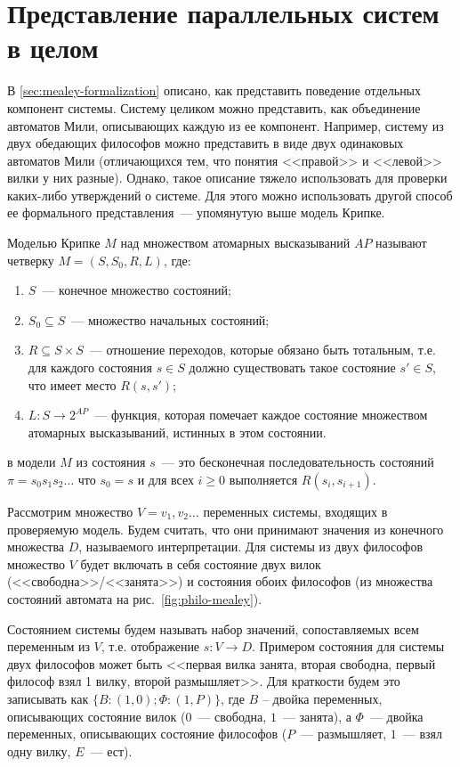 \section{Представление параллельных систем в целом}
\label{sec:kripke-formalization}

В \ref{sec:mealey-formalization} описано, как представить поведение отдельных
компонент системы. Систему целиком можно представить, как объединение автоматов Мили,
описывающих каждую из ее компонент. Например, систему из двух обедающих философов можно
представить в виде двух одинаковых автоматов Мили (отличающихся тем, что понятия
<<правой>> и <<левой>> вилки у них разные). Однако, такое описание тяжело использовать для
проверки каких-либо утверждений о системе. Для этого можно использовать другой способ ее
формального представления~--- упомянутую выше модель Крипке.

Моделью Крипке $M$ над множеством атомарных высказываний $AP$ называют четверку $M=(S,
S_0, R, L)$, где:
\begin{enumerate}
\item $S$~--- конечное множество состояний;
\item $S_0 \subseteq S$~--- множество начальных состояний;
\item $R \subseteq S \times S$~--- отношение переходов, которые обязано быть тотальным,
  т.е. для каждого состояния $s \in S$ должно существовать такое состояние $s' \in S$, что
  имеет место $R(s, s')$;
\item $L: S \rightarrow 2^{AP}$~--- функция, которая помечает каждое состояние множеством
  атомарных высказываний, истинных в этом состоянии.
\end{enumerate}

 в модели $M$ из состояния $s$~--- это бесконечная последовательность состояний
$\pi = s_0s_1s_2 \ldots$ что $s_0 = s$ и для всех $i \geq 0$ выполняется $R(s_i,
s_{i+1})$.

Рассмотрим множество $V = {v_1, v_2 \ldots}$ переменных системы, входящих в проверяемую
модель. Будем считать, что они принимают значения из конечного множества $D$, называемого
 интерпретации. Для системы из двух философов множество $V$ будет включать в
себя состояние двух вилок (<<свободна>>/<<занята>>) и состояния обоих философов (из
множества состояний автомата на рис.~\ref{fig:philo-mealey}). 

Состоянием системы будем называть набор значений, сопоставляемых всем переменным из $V$,
т.е. отображение $s: V \rightarrow D$. Примером состояния для системы двух философов может
быть <<первая вилка занята, вторая свободна, первый философ взял 1 вилку, второй
размышляет>>. Для краткости будем это записывать как $\{B: (1, 0); \Phi: (1, P)\}$, где $B$
-- двойка переменных, описывающих состояние вилок ($0$~--- свободна, $1$~--- занята), а
$\Phi$~--- двойка переменных, описывающих состояние философов ($P$~--- размышляет, $1$~---
взял одну вилку, $E$~--- ест).

